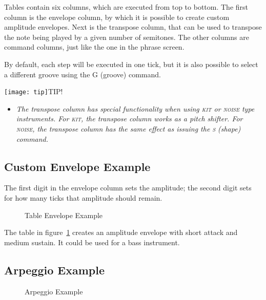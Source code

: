 Tables contain six columns, which are executed from top to bottom.
The first column is the envelope column, by which it is possible to create custom amplitude envelopes. Next is the transpose column, that can be used to transpose the note being played by a given number of semitones. The other columns are command columns, just like the one in the phrase screen.

By default, each step will be executed in one tick, but it is also possible to select a different groove using the G (groove) command.

\texttt{[image: tip]}TIP!
\begin{itemize}
	\item \textit{The transpose column has special functionality when using \textsc{kit} or \textsc{noise} type instruments. For \textsc{kit}, the transpose column works as a pitch shifter. For \textsc{noise}, the transpose column has the same effect as issuing the \textsc{s} (shape) command.}
\end{itemize}

\subsection{Custom Envelope Example}

The first digit in the envelope column sets the amplitude; the second digit sets for how many ticks that amplitude should remain.

\begin{figure}[htpb]
	\begin{center}
	\end{center}
	\caption{Table Envelope Example}
	\label{fig:table-amp}
\end{figure}

The table in figure~\ref{fig:table-amp} creates an amplitude envelope with short attack and medium sustain. It could be used for a bass instrument.

\subsection{Arpeggio Example}

\begin{figure}[htpb]
	\begin{center}
	\end{center}
	\caption{Arpeggio Example}
	\label{fig:table-arp}
\end{figure}

